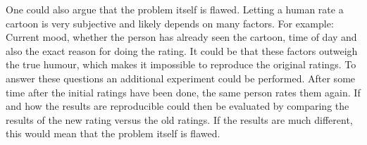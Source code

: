 \documentclass[draft,final,oneside]{vutinfth} %
\begin{document}
One could also argue that the problem itself is flawed. Letting a human rate a
cartoon is very subjective and likely depends on many factors. For example: Current mood, whether the person has already seen the cartoon, time of day and also the exact reason for doing the rating. It could be that these factors outweigh the true humour, which makes it impossible to reproduce the original ratings. To answer these questions an additional experiment could be performed. After some time after the initial ratings have been done, the same person rates them again. If and how the results are reproducible could then be evaluated by comparing the results of the new rating versus the old ratings. If the results are much different, this would mean that the problem itself is flawed.



\backmatter








\end{document}
